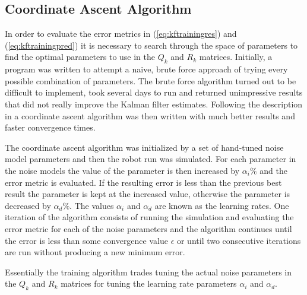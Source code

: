 \subsection{Coordinate Ascent Algorithm}
\label{sec:coordinateAscent}
In order to evaluate the error metrics in (\ref{eq:kftrainingres}) and (\ref{eq:kftrainingpred}) it is necessary to search through the space of parameters to find the optimal parameters to use in the $Q_k$ and $R_k$ matrices. Initially, a program was written to attempt a naive, brute force approach of trying every possible combination of parameters. The brute force algorithm turned out to be difficult to implement, took several days to run and returned unimpressive results that did not really improve the Kalman filter estimates. Following the description in \cite{Abbeel-RSS-05} a coordinate ascent algorithm was then written with much better results and faster convergence times.

The coordinate ascent algorithm was initialized by a set of hand-tuned noise model parameters and then the robot run was simulated. For each parameter in the noise models the value of the parameter is then increased by $\alpha_i \%$ and the error metric is evaluated. If the resulting error is less than the previous best result the parameter is kept at the increased value, otherwise the parameter is decreased by $\alpha_d \%$. The values $\alpha_i$ and $\alpha_d$ are known as the learning rates. One iteration of the algorithm consists of running the simulation and evaluating the error metric for each of the noise parameters and the algorithm continues until the error is less than some convergence value $\epsilon$ or until two consecutive iterations are run without producing a new minimum error.

Essentially the training algorithm trades tuning the actual noise parameters in the $Q_k$ and $R_k$ matrices for tuning the learning rate parameters $\alpha_i$ and $\alpha_d$.
